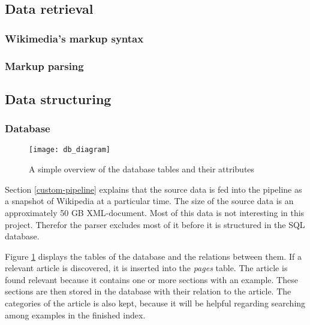 \subsection{Data retrieval}

\subsubsection{Wikimedia's markup syntax}

\subsubsection{Markup parsing}


\subsection{Data structuring}

\subsubsection{Database}

\begin{figure}[h] 
\caption{A simple overview of the database tables and their attributes}
\texttt{[image: db\_diagram]}
\label{fig:db_diagram}
\end{figure}


Section \ref{custom-pipeline} explains that the source data is fed into the pipeline as a snapshot of Wikipedia at a particular time. The size of the source data is an approximately 50 GB XML-document. Most of this data is not interesting in this project. Therefor the parser excludes most of it before it is structured in the SQL database. 

Figure \ref{fig:db_diagram} displays the tables of the database and the relations between them. If a relevant article is discovered, it is inserted into the \textit{pages} table. The article is found relevant because it contains one or more sections with an example. These sections are then stored in the database with their relation to the article. The categories of the article is also kept, because it will be helpful regarding searching among examples in the finished index.  

